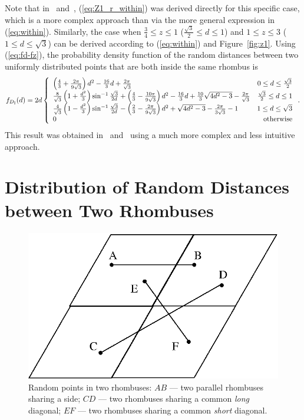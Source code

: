 \documentclass[12pt,draftclsnofoot,onecolumn]{IEEEtran}
\begin{document}
Note that in~\cite{zhuang2011random}
and~\cite{zhuang2012geometrical}, (\ref{eq:Z1_r_within}) was derived directly
for this specific case, which is a more complex approach than via the
more general expression in (\ref{eq:within}).
Similarly, the case when $\frac{3}{4} \leq z \leq 1$ ($\frac{\sqrt{3}}{2}\leq
d\leq 1$) and $1 \leq z \leq 3$ ($1\leq d\leq \sqrt{3}$) can
be derived according to (\ref{eq:within}) and Figure~\ref{fig:z1}.
Using (\ref{eq:fd-fz}), the probability density function of the random distances between two uniformly
distributed points that are both inside the same rhombus is
 \begin{equation}\label{eq:fd_r_within}
  f_{D_{\rm I}}(d)=2d\left\{
    \begin{array}{lr}

\left(\frac{4}{3}+\frac{2\pi}{9\sqrt{3}}\right)d^2-\frac{16}{3}d+\frac{2\pi}{
\sqrt{3}} & 0\leq d\leq \frac{\sqrt{3}}{2}\\

\frac{8}{\sqrt{3}}\left(1+\frac{d^2}{3}\right)\sin^{-1}\frac{\sqrt{3}}{2d}
+\left(\frac{4}{3}-\frac{10\pi}{9\sqrt{3}}\right)d^2-\frac{16}{3}d+\frac{10}{3}
\sqrt{4d^2-3}-\frac{2\pi}{\sqrt{3}} & \frac{\sqrt{3}}{2}\leq d\leq 1\\

\frac{4}{\sqrt{3}}\left(1-\frac{d^2}{3}\right)\sin^{-1}\frac{\sqrt{3}}{2d}
-\left(\frac{2}{3}-\frac{2\pi}{9\sqrt{3}}\right)d^2+\sqrt{4d^2-3}-\frac{2\pi}{
3\sqrt{3}}-1 & 1\leq d\leq \sqrt{3} \\

      0 & {\rm otherwise}
    \end{array}
  \right..
\end{equation}
This result was obtained in~\cite{zhuang2011random} and~\cite{zhuang2012geometrical} using
a much more complex and less intuitive approach.

\section{Distribution of Random Distances between Two Rhombuses}\label{sec-betweenr}

\begin{figure}
  \centering
  \includegraphics[width=0.4\columnwidth]{fig/rhombus}
  \caption{Random points in two rhombuses: $AB$ --- two parallel rhombuses
  sharing a side; $CD$ --- two rhombuses sharing a common \textit{long}
  diagonal; $EF$ --- two rhombuses sharing a common \textit{short} diagonal.}
  \label{fig:two}
\end{figure}
\end{document}
